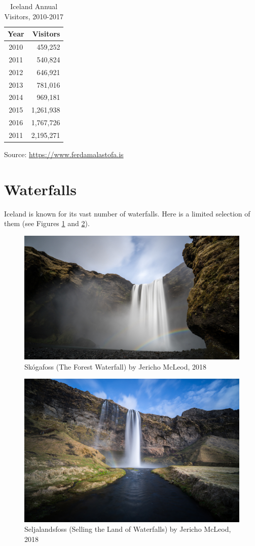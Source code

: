 \documentclass[11pt]{article}
\begin{document}
\begin{table}[h!]
\center
	\begin{tabular}{|c|r|}
		\hline
		Year & Visitors\\
		\hline
		2010 & 459,252\\
		\hline
		2011 & 540,824\\
		\hline
		2012 & 646,921\\
		\hline
		2013 & 781,016\\
		\hline
		2014 & 969,181\\
		\hline
		2015 & 1,261,938\\
		\hline
		2016 & 1,767,726\\
		\hline
		2011 & 2,195,271\\
		\hline
	\end{tabular}
	\caption{Iceland Annual Visitors, 2010-2017}
	\label{tab:IcelandVisitorStats}
\end{table}

Source: 
\href{https://www.ferdamalastofa.is/is/um-ferdamalastofu/frettir/22-milljonir-erlendra-farthega-2017}{https://www.ferdamalastofa.is}

\newpage
\section{Waterfalls}
Iceland is known for its vast number of waterfalls. Here is a limited selection of them (see Figures \ref{fig:skogafoss} and \ref{fig:seljalandsfoss}).

\begin{figure}[h!]
	\centering
	\includegraphics[width=0.7\linewidth]{skogafoss.jpg}
	\caption{Sk\'ogafoss (The Forest Waterfall) by Jericho McLeod, 2018 \textcopyright}
	\label{fig:skogafoss}
\end{figure}

\begin{figure}[h!]
	\centering
	\includegraphics[width=0.7\linewidth]{seljalandsfoss.jpg}
	\caption{Seljalandsfoss (Selling the Land of Waterfalls) by Jericho McLeod, 2018 \textcopyright}
	\label{fig:seljalandsfoss}
\end{figure}
\end{document}
